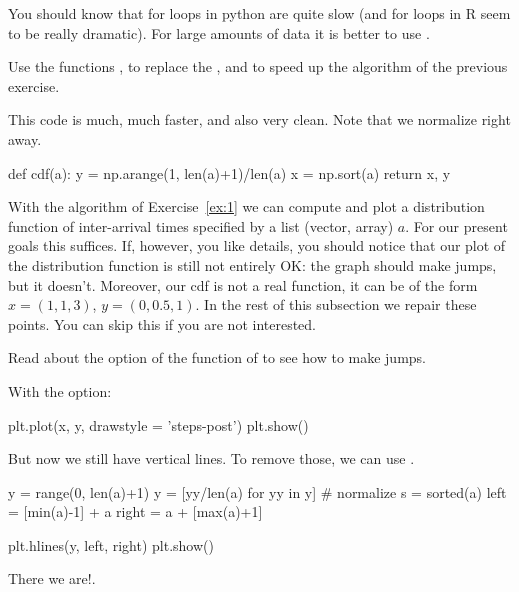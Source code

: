 You should know that for loops in python are quite slow (and for loops in R seem to be really dramatic). For large amounts of data it is better to use . 


\begin{exercise}\label{ex:1}
  Use the  functions , to replace the , and  to speed up the algorithm of the previous exercise. 
  \begin{solution}
    This code is much, much faster, and also very clean. Note that we normalize  right away. 
\begin{pyblock}
def cdf(a):
    y = np.arange(1, len(a)+1)/len(a)
    x = np.sort(a)
    return x, y
  
\end{pyblock}
  \end{solution}
\end{exercise}


With the algorithm of Exercise~\ref{ex:1} we can compute and plot a distribution function of inter-arrival times specified by a list (vector, array) $a$.
For our present goals this suffices.
If, however, you like details, you should notice that our plot of the distribution function is still not entirely OK: the graph should make jumps, but it doesn't.
Moreover, our cdf is not a real function, it can be of the form $x=(1,1,3)$, $y=(0, 0.5, 1)$.
In the rest of this subsection we repair these points.
You can skip this if you are not interested.

\begin{exercise}
Read about the  option of the  function of  to see how to make jumps.
  \begin{solution}
With the  option: 
\begin{pyblock}
plt.plot(x, y,  drawstyle = 'steps-post')
plt.show()
\end{pyblock}


But now we still have vertical lines. To remove those, we can use .

\begin{pyblock}
y = range(0, len(a)+1)
y = [yy/len(a) for yy in y] # normalize
s = sorted(a)
left = [min(a)-1] + a
right = a + [max(a)+1]

plt.hlines(y, left, right)
plt.show()
\end{pyblock}

There  we are!.
  \end{solution}
\end{exercise}


